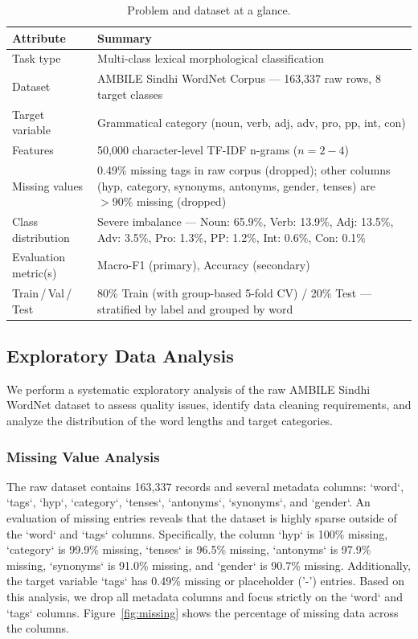 \documentclass[12pt,a4paper]{article}
\begin{document}
\begin{table}[ht]
\centering
\caption{Problem and dataset at a glance.}
\label{tab:problem}
\small
\begin{tabularx}{\linewidth}{l X}
  \toprule
  \textbf{Attribute}          & \textbf{Summary} \\
  \midrule
  Task type                   & Multi-class lexical morphological classification \\
  Dataset                     & AMBILE Sindhi WordNet Corpus --- 163,337 raw rows, 8 target classes \\
  Target variable             & Grammatical category (noun, verb, adj, adv, pro, pp, int, con) \\
  Features                    & 50,000 character-level TF-IDF n-grams ($n=2-4$) \\
  Missing values              & 0.49\% missing tags in raw corpus (dropped); other columns (hyp, category, synonyms, antonyms, gender, tenses) are $>90\%$ missing (dropped) \\
  Class distribution          & Severe imbalance --- Noun: 65.9\%, Verb: 13.9\%, Adj: 13.5\%, Adv: 3.5\%, Pro: 1.3\%, PP: 1.2\%, Int: 0.6\%, Con: 0.1\% \\
  Evaluation metric(s)        & Macro-F1 (primary), Accuracy (secondary) \\
  Train\,/\,Val\,/\,Test      & 80\% Train (with group-based 5-fold CV) / 20\% Test --- stratified by label and grouped by word \\
  \bottomrule
\end{tabularx}
\end{table}

\subsection{Exploratory Data Analysis}
We perform a systematic exploratory analysis of the raw AMBILE Sindhi WordNet dataset to assess quality issues, identify data cleaning requirements, and analyze the distribution of the word lengths and target categories.

\subsubsection{Missing Value Analysis}
The raw dataset contains 163,337 records and several metadata columns: `word`, `tags`, `hyp`, `category`, `tenses`, `antonyms`, `synonyms`, and `gender`. An evaluation of missing entries reveals that the dataset is highly sparse outside of the `word` and `tags` columns. Specifically, the column `hyp` is 100\% missing, `category` is 99.9\% missing, `tenses` is 96.5\% missing, `antonyms` is 97.9\% missing, `synonyms` is 91.0\% missing, and `gender` is 90.7\% missing. Additionally, the target variable `tags` has 0.49\% missing or placeholder ('-') entries. Based on this analysis, we drop all metadata columns and focus strictly on the `word` and `tags` columns. Figure~\ref{fig:missing} shows the percentage of missing data across the columns.
\end{document}
